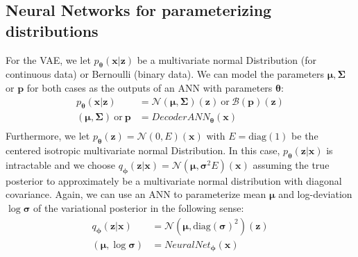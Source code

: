 \documentclass[12pt]{report}
\theoremstyle{definition}
\begin{document}
\subsection{Neural Networks for parameterizing distributions}
For the VAE, we let $p_{\pmb{\theta}}(\mathbf{x}|\mathbf{z})$ be a multivariate normal Distribution (for continuous data) or Bernoulli (binary data). We can model the parameters $\pmb{\mu}, \pmb{\Sigma}$ or $\mathbf{p}$ for both cases as the outputs of an ANN with parameters $\pmb{\theta}$:
\begin{equation}
\begin{split}
p_{\pmb{\theta}}(\mathbf{x}|\mathbf{z}) & = \mathcal{N}(\pmb{\mu}, \pmb{\Sigma})(\mathbf{z}) \ \mathrm{or} \ \mathcal{B}(\mathbf{p})(\mathbf{z}) \\
(\pmb{\mu}, \pmb{\Sigma}) \ \mathrm{or} \ \mathbf{p} & = DecoderANN_{\pmb{\theta}}(\mathbf{x}) \\
\end{split}
\end{equation}
Furthermore, we let $p_{\pmb{\theta}}(\mathbf{z})=\mathcal{N}(0, E)(\mathbf{x})$ with $E=\mathrm{diag}(1)$ be the centered isotropic multivariate normal Distribution. In this case,  $p_{\pmb{\theta}}(\mathbf{z}|\mathbf{x})$ is intractable and we choose $q_{\pmb{\phi}}(\mathbf{z}|\mathbf{x})=\mathcal{N}(\pmb{\mu}, \pmb{\sigma}^2 E)(\mathbf{x})$ assuming the true posterior to approximately be a multivariate normal distribution with diagonal covariance. Again, we can use an ANN to parameterize mean $\pmb{\mu}$ and log-deviation $\log \pmb{\sigma}$ of the variational posterior in the following sense: 
\begin{equation}
\begin{split}
q_{\pmb{\phi}}(\mathbf{z}|\mathbf{x}) & = \mathcal{N}(\pmb{\mu}, \mathrm{diag}(\pmb{\sigma})^2)(\mathbf{z}) \\
(\pmb{\mu}, \log \pmb{\sigma}) & = NeuralNet_{\pmb{\phi}}(\mathbf{x}) \\
\end{split}
\end{equation}
\end{document}
